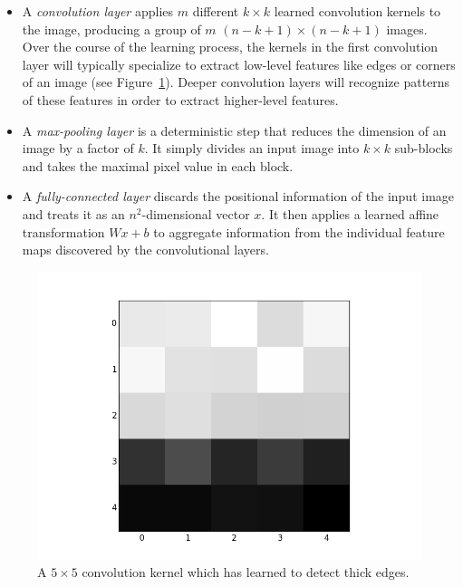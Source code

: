 \documentclass{article}
\begin{document}
  \begin{itemize}
    \item A \emph{convolution layer} applies $m$ different $k\times k$ learned convolution kernels to the image, producing a group of $m$ $(n-k+1) \times (n-k+1)$ images. Over the course of the learning process, the kernels in the first convolution layer will typically specialize to extract low-level features like edges or corners of an image (see Figure~\ref{kernels}). Deeper convolution layers will recognize patterns of these features in order to extract higher-level features.

    \item A \emph{max-pooling layer} is a deterministic step that reduces the dimension of an image by a factor of $k$. It simply divides an input image into $k \times k$ sub-blocks and takes the maximal pixel value in each block.

    \item A \emph{fully-connected layer} discards the positional information of the input image and treats it as an $n^2$-dimensional vector $x$. It then applies a learned affine transformation $Wx + b$ to aggregate information from the individual feature maps discovered by the convolutional layers.
  \end{itemize}

  \begin{figure}[ht]
    \centering
    \includegraphics[scale=0.25]{img/Solid0-4.png}
    \caption{A $5\times 5$ convolution kernel which has learned to detect thick edges.}\label{kernels}
  \end{figure}
\end{document}

